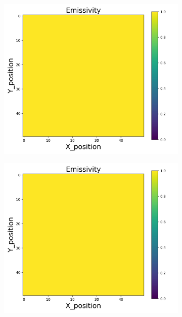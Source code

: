 {\begin{figure}[h]
    \centering
    \begin{minipage}{\textwidth}
        \centering
        \begin{subfigure}{0.27\textwidth}
            \centering
            \includegraphics[width=\textwidth]{figures/raw_data/0/T3500/exp/emi_cal.jpg}
        \end{subfigure}
        \begin{subfigure}{0.27\textwidth}
            \centering
            \includegraphics[width=\textwidth]{figures/raw_data/5/T3500/exp/emi_cal.jpg}

\end{subfigure}
\end{minipage}
\end{figure}}
